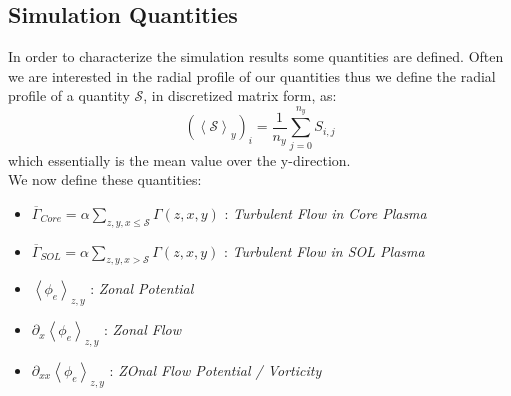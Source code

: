 \documentclass[master.tex]{subfiles}
\newcommand{\meanxy}[1]{\left<#1\right>_{z,y}}
\begin{document}
\subsection{Simulation Quantities}\label{sec:simulation_quantities}

In order to characterize the simulation results some quantities are defined. Often we are interested in the radial profile of our quantities thus we define the radial profile of a quantity $\mathcal{S}$, in discretized matrix form, as:
\begin{equation}
    (\left<\mathcal{S}\right>_y)_i = \frac{1}{n_y} \sum_{j=0}^{n_y} S_{i, j}
\end{equation}
which essentially is the mean value over the y-direction.\\
We now define these quantities:

\begin{itemize}
    \item $\overline{\Gamma}_{Core} = \alpha \sum_{z, y, x \leq \mathcal{S}} \Gamma(z,x,y)$ : \textit{Turbulent Flow in Core Plasma}
    \item $\overline{\Gamma}_{SOL} = \alpha \sum_{z, y, x > \mathcal{S}} \Gamma(z,x,y)$ : \textit{Turbulent Flow in \ac{SOL} Plasma}
    \item $\meanxy{\phi_e}$ : \textit{Zonal Potential}
    \item $\partial_x \meanxy{\phi_e}$ : \textit{Zonal Flow}
    \item $\partial_{xx}\meanxy{\phi_e}$ : \textit{ZOnal Flow Potential / Vorticity}
\end{itemize}
\end{document}
